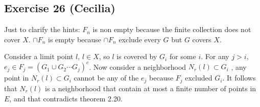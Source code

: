 \subsection*{Exercise 26 (Cecilia)}
Just to clarify the hints:
$ F_n $ is non empty because the finite collection does not cover $ X $.
$ \cap F_n $ is empty because $ \cap F_n $ exclude every $ G $ but $ G $ covers $ X $.

Consider a limit point $ l $, $ l \in X $, so $ l $ is covered by $ G_i $ for some $ i $. For any $ j > i $, $ e_j \in F_j = (G_1 \cup G_2 \cdots G_j)^c $. Now consider a neighborhood $ N_r(l) \subset G_i $ , any point in $ N_r(l) \subset G_i $ cannot be any of the $ e_j $ because $ F_j $ excluded $ G_i $. It follows that $ N_r(l) $ is a neighborhood that contain at most a finite number of points in $ E $, and that contradicts theorem 2.20.